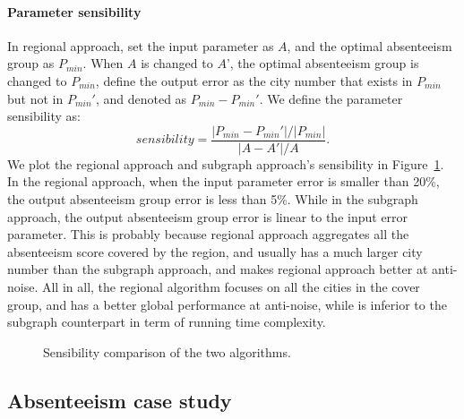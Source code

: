 \paragraph{Parameter sensibility}In regional approach, set the input parameter as $A$, and the optimal absenteeism group as $P_{min}$. When $A$ is changed to $A$', the optimal absenteeism group is changed to $P_{min}$, define the output error as the city number that exists in $P_{min}$ but not in $P_{min}'$, and denoted as $P_{min}-P_{min}'$. We define the parameter sensibility as: $$sensibility=\frac{{|P_{min}-P_{min}'|}/{|P_{min}|}}{|A-A'|/{A}}.$$ We plot the regional approach and subgraph approach's sensibility in Figure~\ref{fig:sensibility}. In the regional approach, when the input parameter error is smaller than 20\%, the output absenteeism group error is less than 5\%. While in the subgraph approach, the output absenteeism group error is linear to the input error parameter. This is probably because regional approach aggregates all the absenteeism score covered by the region, and usually has a much larger city number than the subgraph approach, and makes regional approach better at anti-noise.  All in all, the regional algorithm focuses on all the cities in the cover group, and has a better global performance at anti-noise, while is inferior to the subgraph counterpart in term of running time complexity.
\begin{figure}[h]
	\centering
	\vspace{-1em}
	\caption{Sensibility comparison of the two algorithms.}
	\label{fig:sensibility}
\end{figure}

\subsection{Absenteeism case study}
